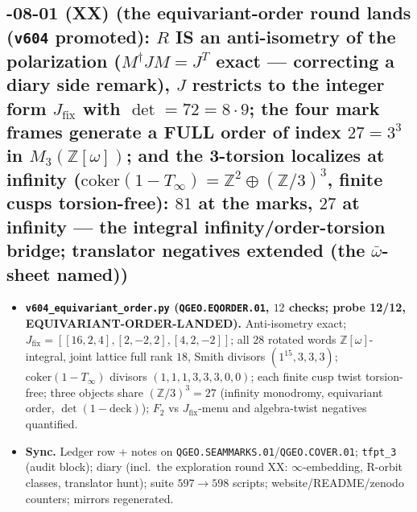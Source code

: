 \documentclass[11pt]{article}
\begin{document}
\subsection*{-08-01 (XX) (the equivariant-order round lands (\texttt{v604} promoted): $R$ IS an anti-isometry of the polarization ($M^\dagger JM=J^T$ exact --- correcting a diary side remark), $J$ restricts to the integer form $J_{\mathrm{fix}}$ with $\det=72=8\cdot9$; the four mark frames generate a FULL order of index $27=3^3$ in $M_3(\mathbb{Z}[\omega])$; and the 3-torsion localizes at infinity ($\mathrm{coker}(1-T_\infty)=\mathbb{Z}^2\oplus(\mathbb{Z}/3)^3$, finite cusps torsion-free): $81$ at the marks, $27$ at infinity --- the integral infinity/order-torsion bridge; translator negatives extended (the $\bar\omega$-sheet named))}
\begin{itemize}[leftmargin=1.5em]
\item \textbf{\texttt{v604\_equivariant\_order.py} (\texttt{QGEO.EQORDER.01}, $12$ checks; probe
12/12, EQUIVARIANT-ORDER-LANDED).} Anti-isometry exact; $J_{\mathrm{fix}}=[[16,2,4],[2,-2,2],[4,2,-2]]$;
all $28$ rotated words $\mathbb{Z}[\omega]$-integral, joint lattice full rank $18$, Smith
divisors $(1^{15},3,3,3)$; $\mathrm{coker}(1-T_\infty)$ divisors $(1,1,1,3,3,3,0,0)$; each
finite cusp twist torsion-free; three objects share $(\mathbb{Z}/3)^3=27$ (infinity
monodromy, equivariant order, $\det(1-\mathrm{deck})$); $F_2$ vs $J_{\mathrm{fix}}$-menu and
algebra-twist negatives quantified.
\item \textbf{Sync.} Ledger row + notes on
\texttt{QGEO.SEAMMARKS.01}/\texttt{QGEO.COVER.01}; \texttt{tfpt\_3} (audit block); diary
(incl.\ the exploration round XX: $\infty$-embedding, R-orbit classes, translator hunt);
suite $597\to598$ scripts; website/README/zenodo counters; mirrors regenerated.
\end{itemize}
\end{document}
